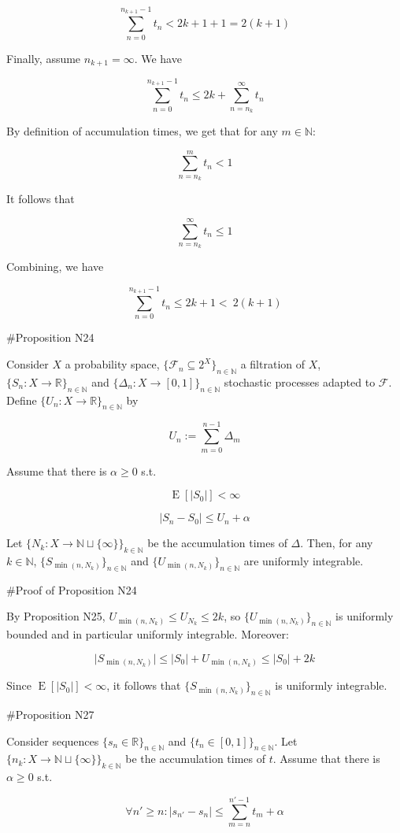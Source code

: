 \documentclass[a4paper]{article}
\DeclareMathOperator{\E}{E}
\newcommand{\Nats}{\mathbb{N}}
\newcommand{\Reals}{\mathbb{R}}
\newcommand{\Sq}[2]{\{#1\}_{#2 \in \Nats}}
\newcommand{\Sqn}[1]{\Sq{#1}{n}}
\newcommand{\Abs}[1]{\lvert #1 \rvert}
\newcommand{\F}{\mathcal{F}}
\begin{document}
$$\sum_{n = 0}^{n_{k+1} - 1} t_n < 2k + 1 + 1 = 2(k+1)$$

Finally, assume ${n_{k+1} = \infty}$. We have

$$\sum_{n = 0}^{n_{k+1} - 1} t_n \leq 2k + \sum_{n = n_k}^{\infty} t_n$$

By definition of accumulation times, we get that for any ${m \in \Nats}$:

$$\sum_{n = n_k}^{m} t_n < 1$$

It follows that

$$\sum_{n = n_k}^{\infty} t_n \leq 1$$

Combining, we have

$$\sum_{n = 0}^{n_{k+1} - 1} t_n \leq 2k+1 <\ 2(k+1)$$

\#Proposition N24

Consider ${X}$ a probability space, ${\{\F_n \subseteq 2^X\}_{n \in \Nats}}$ a filtration of ${X}$, ${\{S_n:X \rightarrow \Reals\}_{n \in \Nats}}$ and ${\{\Delta_n:X \rightarrow [0,1]\}_{n \in \Nats}}$ stochastic processes adapted to ${\F}$. Define ${\Sqn{U_n: X \rightarrow \Reals}}$ by

$$U_n := \sum_{m=0}^{n-1} \Delta_m$$

Assume that there is ${\alpha \geq 0}$ s.t.

$$\E[\Abs{S_0}] < \infty$$

$$\Abs{S_{n}-S_0} \leq U_n + \alpha$$

Let ${\{N_k: X \rightarrow \Nats \sqcup \{\infty\}\}_{k \in \Nats}}$ be the accumulation times of ${\Delta}$. Then, for any ${k \in \Nats}$, ${\Sqn{S_{\min(n,N_k)}}}$ and ${\Sqn{U_{\min(n,N_k)}}}$ are uniformly integrable.

\#Proof of Proposition N24

By Proposition N25, $U_{\min(n,N_k)} \leq U_{N_k} \leq 2k$, so ${\Sqn{U_{\min(n,N_k)}}}$ is uniformly bounded and in particular uniformly integrable. Moreover:

$$\Abs{S_{\min(n,N_k)}} \leq \Abs{S_0} + U_{\min(n,N_k)} \leq \Abs{S_0} + 2k$$

Since ${\E[\Abs{S_0}] < \infty}$, it follows that ${\Sqn{S_{\min(n,N_k)}}}$ is uniformly integrable.

\#Proposition N27

Consider sequences ${\Sqn{s_n \in \Reals}}$ and ${\Sqn{t_n \in [0,1]}}$. Let ${\{n_k: X \rightarrow \Nats \sqcup \{\infty\}\}_{k \in \Nats}}$ be the accumulation times of ${t}$. Assume that there is ${\alpha \geq 0}$ s.t.

$${\forall n' \geq n: \Abs{s_{n'} - s_n} \leq \sum_{m=n}^{n'-1} t_m + \alpha}$$
\end{document}
